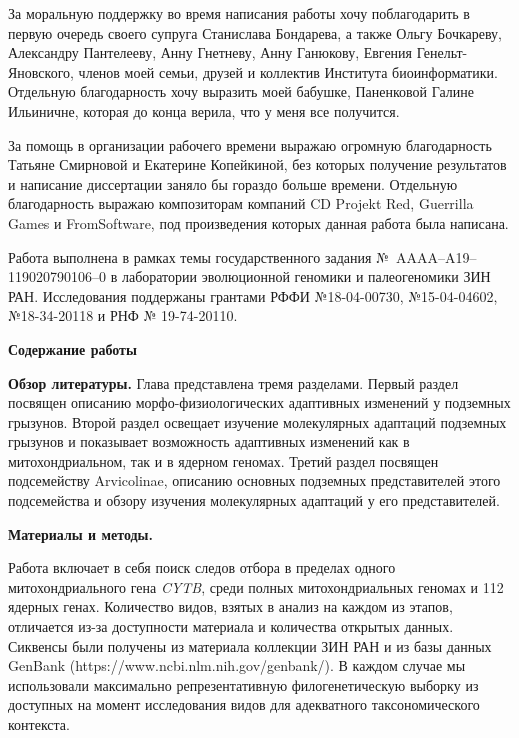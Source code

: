За моральную поддержку во время написания работы хочу поблагодарить в первую очередь своего супруга Станислава Бондарева, а также Ольгу Бочкареву, Александру Пантелееву, Анну Гнетневу, Анну Ганюкову, Евгения Генельт-Яновского, членов моей семьи, друзей и коллектив Института биоинформатики. Отдельную благодарность хочу выразить моей бабушке, Паненковой Галине Ильиничне, которая до конца верила, что у меня все получится. 

За помощь в организации рабочего времени выражаю огромную благодарность Татьяне Смирновой и Екатерине Копейкиной, без которых получение результатов и написание диссертации заняло бы гораздо больше времени. Отдельную благодарность выражаю композиторам компаний CD Projekt Red, Guerrilla Games и FromSoftware, под произведения которых данная работа была написана. 

Работа выполнена в рамках темы государственного задания №~AAAA–A19–119020790106–0 в лаборатории эволюционной геномики и палеогеномики ЗИН РАН. Исследования поддержаны грантами РФФИ №18-04-00730, №15-04-04602, №18-34-20118 и РНФ № 19-74-20110.


\newpage
\hspace{-10mm}\textbf{\Large Содержание работы}

\vspace{3mm}

\hspace{-10mm}\textbf{\Large Обзор литературы.}
Глава представлена тремя разделами. Первый раздел посвящен описанию морфо-физиологических адаптивных изменений у подземных грызунов. Второй раздел освещает изучение молекулярных адаптаций подземных грызунов и показывает возможность адаптивных изменений как в митохондриальном, так и в ядерном геномах. Третий раздел посвящен подсемейству Arvicolinae, описанию основных подземных представителей этого подсемейства и обзору изучения молекулярных адаптаций у его представителей. 

\vspace{3mm}

\hspace{-10mm}\textbf{\Large Материалы и методы.}

\vspace{3mm}

Работа включает в себя поиск следов отбора в пределах одного митохондриального гена \textit{CYTB}, среди полных митохондриальных геномах и 112 ядерных генах. Количество видов, взятых в анализ на каждом из этапов, отличается из-за доступности материала и количества открытых данных. Сиквенсы были получены из материала коллекции ЗИН РАН и из базы данных GenBank (https://www.ncbi.nlm.nih.gov/genbank/). В каждом случае мы использовали максимально репрезентативную филогенетическую выборку из доступных на момент исследования видов для адекватного таксономического контекста.

